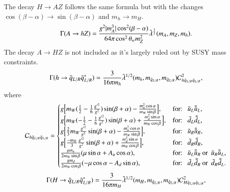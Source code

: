 \documentclass[final,3p,times,pdflatex]{elsarticle}
\begin{document}
The decay $H \rightarrow AZ$ follows the same formula but with the changes $\cos(\beta - \alpha) \rightarrow \sin(\beta - \alpha)$ and $m_h \rightarrow m_H$.
\begin{equation}\label{AhZ}
\Gamma (A \rightarrow h Z) = {g^2 |m_A^3| \cos^2 (\beta -\alpha) \over 64\pi \cos^2 \theta_w m_{Z}^2} \tilde{\lambda}^{3 \over 2} (m_A,m_Z, m_h).
\end{equation} 
The decay $A \rightarrow HZ$ is not included as it's largely ruled out by SUSY mass constraints.
\begin{equation}\label{hqLRqLR}
\Gamma(h \rightarrow \tilde{q}_{L/R} \tilde{q}_{L/R}^*) = {3 \over 16 \pi m_h} \tilde{\lambda}^{1/2}(m_h,m_{\tilde{q}_{L/R}},m_{\tilde{q}_{L/R}}) \mathcal{C}_{h \tilde{q}_{L/R} \tilde{q}_{L/R}}^2,
\end{equation} 
where
\begin{equation}
\mathcal{C}_{h \tilde{q}_{L/R} \tilde{q}_{L/R}} = \begin{cases}
			g\Big[m_W ({1 \over 2} - {1 \over 6}{g'^2 \over g^2} )\sin(\beta+\alpha) - {m_{u}^2 \cos \alpha \over m_W \sin \beta}\Big], & $for: $\: \: \tilde{u}_L\bar{\tilde{u}}_L, \\
			g\Big[m_W (-{1 \over 2} - {1 \over 6}{g'^2 \over g^2} )\sin(\beta+\alpha) + {m_{d}^2 \sin \alpha \over m_W \cos \beta}\Big], & $for: $ \: \: \tilde{d}_L\bar{\tilde{d}}_L, \\
			g\Big[{2 \over 3}m_W{g'^2 \over g^2}\sin(\beta+\alpha) - {m_{u}^2 \cos \alpha \over m_W \sin \beta}\Big], & $for: $ \: \: \tilde{u}_R\bar{\tilde{u}}_R, \\
			g\Big[{-m_W \over 3}{g'^2 \over g^2}\sin(\beta+\alpha) + {m_{d}^2 \sin \alpha \over m_W \cos \beta}\Big], & $for: $ \: \: \tilde{d}_R\bar{\tilde{d}}_R, \\
			{g m_{u} \over 2 m_{W} \sin\beta}(\mu \sin\alpha + A_{u}\cos\alpha), & $for: $ \: \: \tilde{u}_L \bar{\tilde{u}}_R \: $or $\: \tilde{u}_R \bar{\tilde{u}}_L, \\ 
			{g m_{d} \over 2 m_{W} \cos\beta}(-\mu \cos\alpha - A_{d}\sin\alpha), & $for: $ \: \: \tilde{d}_L \bar{\tilde{d}}_R \: $or $\: \tilde{d}_R \bar{\tilde{d}}_L.\\
			\end{cases}
\end{equation}
\begin{equation}\label{HqLRqLR}
\Gamma(H \rightarrow \tilde{q}_{L/R} \tilde{q}_{L/R}^*) = {3 \over 16 \pi m_H} \tilde{\lambda}^{1/2}(m_{H},m_{\tilde{q}_{L/R}}, m_{\tilde{q}_{L/R}}) \mathcal{C}_{H \tilde{q}_{L/R} \tilde{q}_{L/R}}^2,
\end{equation} 
\end{document}
